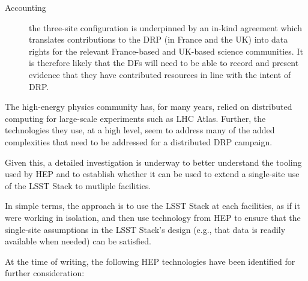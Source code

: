 \begin{description}
\item [Accounting] the three-site configuration is underpinned by an in-kind agreement which translates contributions to the DRP (in France and the UK) into data rights for the relevant France-based and UK-based science communities. It is therefore likely that the DFs will need to be able to record and present evidence that they have contributed resources in line with the intent of DRP. 

\end{description}

The high-energy physics community has, for many years, relied on distributed computing for large-scale experiments such as LHC Atlas. Further, the technologies they use, at a high level, seem to address many of the added complexities that need to be addressed for a distributed DRP campaign.

Given this, a detailed investigation is underway to better understand the tooling used by HEP and to establish whether it can be used to extend a single-site use of the LSST Stack to mutliple facilities.

In simple terms, the approach is to use the LSST Stack at each facilities, as if it were working in isolation, and then use technology from HEP to ensure that the single-site assumptions in the LSST Stack's design (e.g., that data is readily available when needed) can be satisfied.

At the time of writing, the following HEP technologies have been identified for further consideration:

